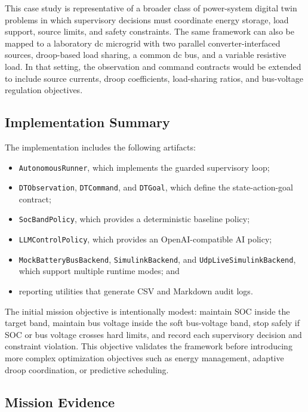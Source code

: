 \documentclass[conference]{IEEEtran}
\begin{document}
This case study is representative of a broader class of power-system digital
twin problems in which supervisory decisions must coordinate energy storage,
load support, source limits, and safety constraints. The same framework can
also be mapped to a laboratory dc microgrid with two parallel
converter-interfaced sources, droop-based load sharing, a common dc bus, and a
variable resistive load. In that setting, the observation and command
contracts would be extended to include source currents, droop coefficients,
load-sharing ratios, and bus-voltage regulation objectives.

\subsection{Implementation Summary}

The implementation includes the following artifacts:
\begin{itemize}
    \item \texttt{AutonomousRunner}, which implements the guarded supervisory
    loop;
    \item \texttt{DTObservation}, \texttt{DTCommand}, and \texttt{DTGoal},
    which define the state-action-goal contract;
    \item \texttt{SocBandPolicy}, which provides a deterministic baseline
    policy;
    \item \texttt{LLMControlPolicy}, which provides an OpenAI-compatible AI
    policy;
    \item \texttt{MockBatteryBusBackend}, \texttt{SimulinkBackend}, and
    \texttt{UdpLiveSimulinkBackend}, which support multiple runtime modes; and
    \item reporting utilities that generate CSV and Markdown audit logs.
\end{itemize}

The initial mission objective is intentionally modest: maintain SOC inside the
target band, maintain bus voltage inside the soft bus-voltage band, stop
safely if SOC or bus voltage crosses hard limits, and record each supervisory
decision and constraint violation. This objective validates the framework
before introducing more complex optimization objectives such as energy
management, adaptive droop coordination, or predictive scheduling.

\subsection{Mission Evidence}
\end{document}

